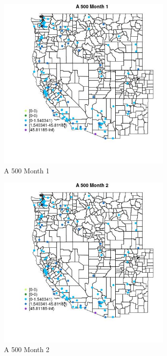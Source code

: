 \begin{figure} 
\centering  
\includegraphics[width=0.77\textwidth]{Code_Outputs/Report_ML_input_PM25_Step4_part_e_de_duplicated_aves_MapObsMo1A_500.jpg} 
\caption{\label{fig:Report_ML_input_PM25_Step4_part_e_de_duplicated_avesMapObsMo1A_500}A 500 Month 1} 
\end{figure} 
 

\begin{figure} 
\centering  
\includegraphics[width=0.77\textwidth]{Code_Outputs/Report_ML_input_PM25_Step4_part_e_de_duplicated_aves_MapObsMo2A_500.jpg} 
\caption{\label{fig:Report_ML_input_PM25_Step4_part_e_de_duplicated_avesMapObsMo2A_500}A 500 Month 2} 
\end{figure} 
 

